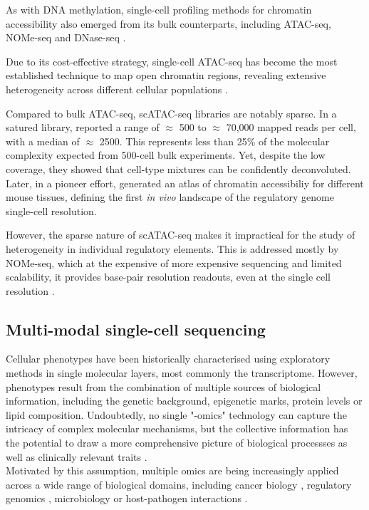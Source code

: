 As with DNA methylation, single-cell profiling methods for chromatin accessibility also emerged from its bulk counterparts, including ATAC-seq\cite{Buenrostro2015a}, NOMe-seq \cite{Pott2016} and DNase-seq \cite{Jin2015}.

Due to its cost-effective strategy, single-cell ATAC-seq has become the most established technique to map open chromatin regions, revealing extensive heterogeneity across different cellular populations \cite{Cusanovich2015,Cao2018,Chen2018}. 

Compared to bulk ATAC-seq, scATAC-seq libraries are notably sparse. In a satured library, \cite{Cusanovich2015} reported a range of $\approx$ 500 to $\approx$ 70,000 mapped reads per cell, with a median of $\approx$ 2500. This represents less than 25\% of the molecular complexity expected from 500-cell bulk experiments. Yet, despite the low coverage, they showed that cell-type mixtures can be confidently deconvoluted. Later, in a pioneer effort, \cite{Cusanovich2018b} generated an atlas of chromatin accessibiliy for different mouse tissues, defining the first \textit{in vivo} landscape of the regulatory genome single-cell resolution.

However, the sparse nature of scATAC-seq makes it impractical for the study of heterogeneity in individual regulatory elements. This is addressed mostly by NOMe-seq, which at the expensive of more expensive sequencing and limited scalability, it provides base-pair resolution readouts, even at the single cell resolution \cite{Pott2016}.


\subsection{Multi-modal single-cell sequencing}
Cellular phenotypes have been historically characterised using exploratory methods in single molecular layers, most commonly the transcriptome. However, phenotypes result from the combination of multiple sources of biological information, including the genetic background, epigenetic marks, protein levels or lipid composition. Undoubtedly, no single "-omics" technology can capture the intricacy of complex molecular mechanisms, but the collective information has the potential to draw a more comprehensive picture of biological processses as well as clinically relevant traits \cite{Hasin2017,Ritchie2015}.\\
Motivated by this assumption, multiple omics are being increasingly applied across a wide range of biological domains, including cancer biology \cite{Akavia2010,Gerstung2015}, regulatory genomics \cite{Chen2016}, microbiology \cite{Kim2016} or host-pathogen interactions \cite{Soderholm2016}.\\ 


